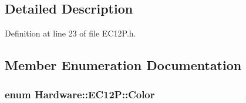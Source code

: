 \subsection{Detailed Description}


Definition at line 23 of file E\+C12\+P.\+h.



\subsection{Member Enumeration Documentation}
\hypertarget{class_hardware_1_1_e_c12_p_a8341f410cd939bf03160fe239bc782aa}{}
\subsubsection[{Color}]{\setlength{\rightskip}{0pt plus 5cm}enum {\bf Hardware\+::\+E\+C12\+P\+::\+Color}}\label{class_hardware_1_1_e_c12_p_a8341f410cd939bf03160fe239bc782aa}
